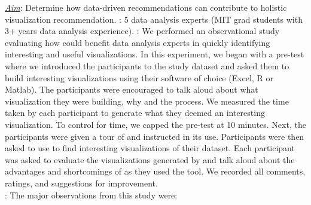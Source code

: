 {\it \underline{Aim}}: Determine how data-driven recommendations can contribute to holistic visualization recommendation.
: 5 data analysis experts (MIT grad students with 3+ years data analysis experience).
: We performed an observational study evaluating how \SeeDB could benefit data analysis experts in quickly identifying interesting and useful visualizations.
In this experiment, we began with a pre-test where we introduced the participants to the study dataset and asked them to build interesting visualizations using their software of choice (Excel, R or Matlab).
The participants were encouraged to talk aloud about what visualization they were building, why and the process.
We measured the time taken by each participant to generate what they deemed an interesting visualization.
To control for time, we capped the pre-test at 10 minutes.
Next, the participants were given a tour of \SeeDB and instructed in its use.
Participants were then asked to use \SeeDB to find interesting visualizations of their dataset.
Each participant was asked to evaluate the visualizations generated by \SeeDB and talk aloud about the advantages and shortcomings of \SeeDB as they used the tool.
We recorded all comments, ratings, and suggestions for improvement.\\
:
The major observations from this study were:
